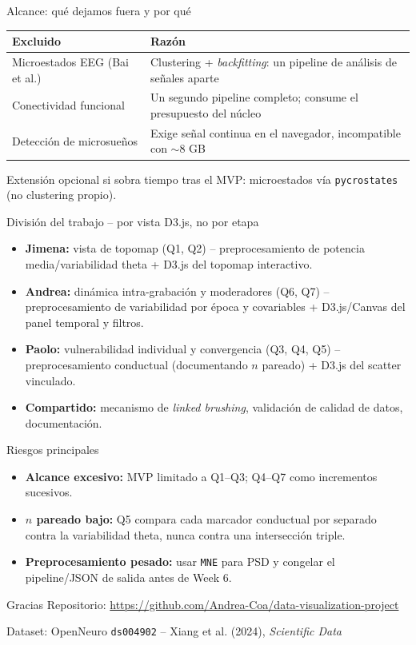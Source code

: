 \documentclass[10pt,aspectratio=169]{beamer}
\begin{document}
\begin{frame}{Alcance: qué dejamos fuera y por qué}
\begin{tabular}{@{}p{}p{}@{}}
\toprule
\textbf{Excluido} & \textbf{Razón} \\
\midrule
Microestados EEG (Bai et al.) & Clustering + \emph{backfitting}: un pipeline de análisis de señales aparte \\
Conectividad funcional & Un segundo pipeline completo; consume el presupuesto del núcleo \\
Detección de microsueños & Exige señal continua en el navegador, incompatible con $\sim$8 GB \\
\bottomrule
\end{tabular}
\vspace{0.5em}

\small Extensión opcional si sobra tiempo tras el MVP: microestados vía \texttt{pycrostates} (no clustering propio).
\end{frame}

\begin{frame}{División del trabajo -- por vista D3.js, no por etapa}
\begin{itemize}
    \item \textbf{Jimena:} vista de topomap (Q1, Q2) -- preprocesamiento de potencia media/variabilidad theta + D3.js del topomap interactivo.
    \item \textbf{Andrea:} dinámica intra-grabación y moderadores (Q6, Q7) -- preprocesamiento de variabilidad por época y covariables + D3.js/Canvas del panel temporal y filtros.
    \item \textbf{Paolo:} vulnerabilidad individual y convergencia (Q3, Q4, Q5) -- preprocesamiento conductual (documentando $n$ pareado) + D3.js del scatter vinculado.
    \item \textbf{Compartido:} mecanismo de \emph{linked brushing}, validación de calidad de datos, documentación.
\end{itemize}
\end{frame}

\begin{frame}{Riesgos principales}
\begin{itemize}
    \item \textbf{Alcance excesivo:} MVP limitado a Q1--Q3; Q4--Q7 como incrementos sucesivos.
    \item \textbf{$n$ pareado bajo:} Q5 compara cada marcador conductual por separado contra la variabilidad theta, nunca contra una intersección triple.
    \item \textbf{Preprocesamiento pesado:} usar \texttt{MNE} para PSD y congelar el pipeline/JSON de salida antes de Week 6.
\end{itemize}
\end{frame}

\begin{frame}{Gracias}
\centering
\Large Repositorio: \url{https://github.com/Andrea-Coa/data-visualization-project}

\vspace{1em}
\normalsize Dataset: OpenNeuro \texttt{ds004902} -- Xiang et al. (2024), \emph{Scientific Data}
\end{frame}
\end{document}
